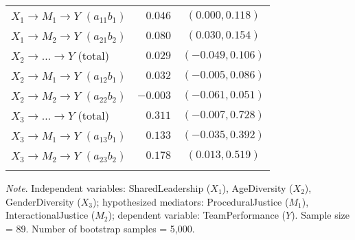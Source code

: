 \documentclass{article}\usepackage[]{graphicx}\usepackage[]{xcolor}
\begin{document}
\begin{table}[h!]
\begin{center}
\begin{tabular}{lrrrr}
$X_{1} \rightarrow M_{1} \rightarrow Y$ $(a_{11}b_{1})$ & $0.046$ & \multicolumn{3}{c}{$(0.000, 0.118)$} \\ 
$X_{1} \rightarrow M_{2} \rightarrow Y$ $(a_{21}b_{2})$ & $0.080$ & \multicolumn{3}{c}{$(0.030, 0.154)$} \\ 
$X_{2} \rightarrow  \ldots  \rightarrow Y$ (total) & $0.029$ & \multicolumn{3}{c}{$(-0.049, 0.106)$} \\ 
$X_{2} \rightarrow M_{1} \rightarrow Y$ $(a_{12}b_{1})$ & $0.032$ & \multicolumn{3}{c}{$(-0.005, 0.086)$} \\ 
$X_{2} \rightarrow M_{2} \rightarrow Y$ $(a_{22}b_{2})$ & $-0.003$ & \multicolumn{3}{c}{$(-0.061, 0.051)$} \\ 
$X_{3} \rightarrow  \ldots  \rightarrow Y$ (total) & $0.311$ & \multicolumn{3}{c}{$(-0.007, 0.728)$} \\ 
$X_{3} \rightarrow M_{1} \rightarrow Y$ $(a_{13}b_{1})$ & $0.133$ & \multicolumn{3}{c}{$(-0.035, 0.392)$} \\ 
$X_{3} \rightarrow M_{2} \rightarrow Y$ $(a_{23}b_{2})$ & $0.178$ & \multicolumn{3}{c}{$(0.013, 0.519)$} \\ 
\noalign{\smallskip}\hline
\end{tabular}
\end{center}
\emph{Note}. Independent variables: SharedLeadership ($X_{1}$), AgeDiversity ($X_{2}$), GenderDiversity ($X_{3}$); hypothesized mediators: ProceduralJustice ($M_{1}$), InteractionalJustice ($M_{2}$); dependent variable: TeamPerformance ($Y$). Sample size = 89. Number of bootstrap samples = 5,000.
\end{table}
\end{document}
